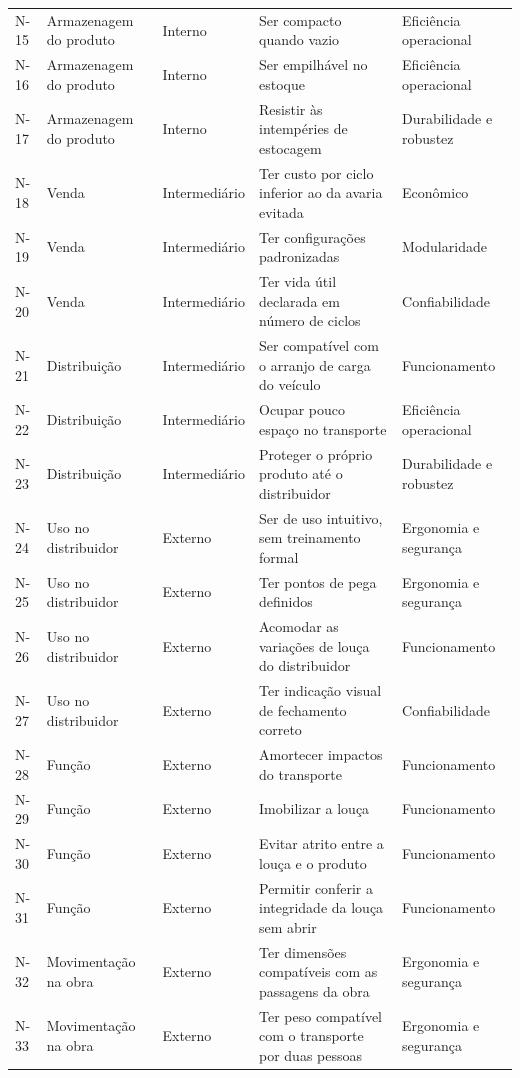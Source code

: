 \begin{longtable}{@{}L{1.05cm}@{\hspace{0.22cm}}L{2.9cm}@{\hspace{0.22cm}}L{2.15cm}@{\hspace{0.22cm}}L{5.85cm}@{\hspace{0.22cm}}L{2.55cm}@{}}
N-15 & Armazenagem do produto & Interno & Ser compacto quando vazio & Eficiência operacional \\
N-16 & Armazenagem do produto & Interno & Ser empilhável no estoque & Eficiência operacional \\
N-17 & Armazenagem do produto & Interno & Resistir às intempéries de estocagem & Durabilidade e robustez \\
N-18 & Venda & Intermediário & Ter custo por ciclo inferior ao da avaria evitada & Econômico \\
N-19 & Venda & Intermediário & Ter configurações padronizadas & Modularidade \\
N-20 & Venda & Intermediário & Ter vida útil declarada em número de ciclos & Confiabilidade \\
N-21 & Distribuição & Intermediário & Ser compatível com o arranjo de carga do veículo & Funcionamento \\
N-22 & Distribuição & Intermediário & Ocupar pouco espaço no transporte & Eficiência operacional \\
N-23 & Distribuição & Intermediário & Proteger o próprio produto até o distribuidor & Durabilidade e robustez \\
N-24 & Uso no distribuidor & Externo & Ser de uso intuitivo, sem treinamento formal & Ergonomia e segurança \\
N-25 & Uso no distribuidor & Externo & Ter pontos de pega definidos & Ergonomia e segurança \\
N-26 & Uso no distribuidor & Externo & Acomodar as variações de louça do distribuidor & Funcionamento \\
N-27 & Uso no distribuidor & Externo & Ter indicação visual de fechamento correto & Confiabilidade \\
N-28 & Função & Externo & Amortecer impactos do transporte & Funcionamento \\
N-29 & Função & Externo & Imobilizar a louça & Funcionamento \\
N-30 & Função & Externo & Evitar atrito entre a louça e o produto & Funcionamento \\
N-31 & Função & Externo & Permitir conferir a integridade da louça sem abrir & Funcionamento \\
N-32 & Movimentação na obra & Externo & Ter dimensões compatíveis com as passagens da obra & Ergonomia e segurança \\
N-33 & Movimentação na obra & Externo & Ter peso compatível com o transporte por duas pessoas & Ergonomia e segurança \\

\end{longtable}
